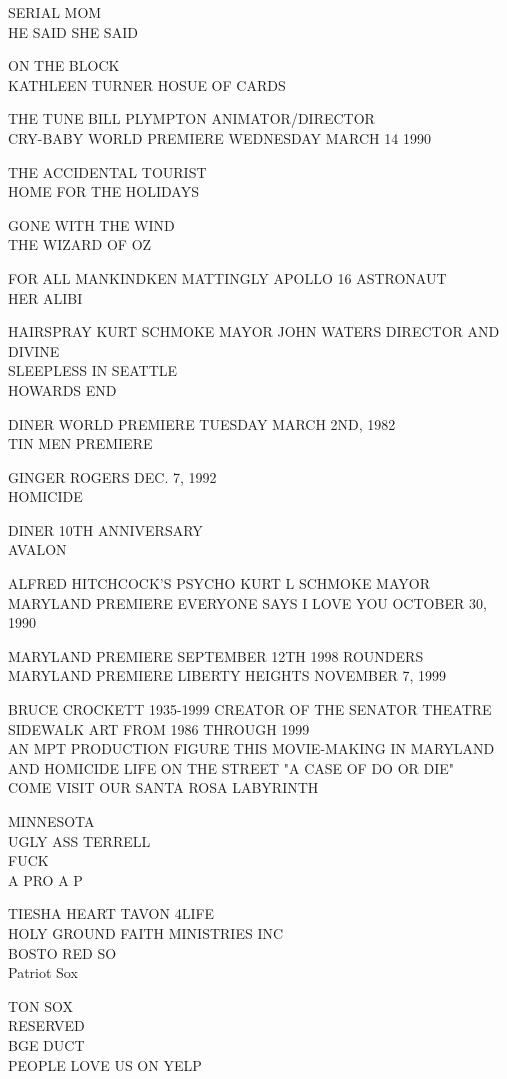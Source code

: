 \documentclass[10pt,letterpaper]{article}
\begin{document}
SERIAL MOM\\
HE SAID SHE SAID

ON THE BLOCK\\
KATHLEEN TURNER HOSUE OF CARDS

THE TUNE BILL PLYMPTON ANIMATOR/DIRECTOR\\
CRY{-}BABY WORLD PREMIERE WEDNESDAY MARCH 14 1990

THE ACCIDENTAL TOURIST\\
HOME FOR THE HOLIDAYS

GONE WITH THE WIND\\
THE WIZARD OF OZ

FOR ALL MANKINDKEN MATTINGLY APOLLO 16 ASTRONAUT\\
HER ALIBI

HAIRSPRAY KURT SCHMOKE MAYOR JOHN WATERS DIRECTOR AND DIVINE\\
SLEEPLESS IN SEATTLE\\
HOWARDS END

DINER WORLD PREMIERE TUESDAY MARCH 2ND, 1982\\
TIN MEN PREMIERE

GINGER ROGERS DEC. 7, 1992\\
HOMICIDE

DINER 10TH ANNIVERSARY\\
AVALON

ALFRED HITCHCOCK'S PSYCHO KURT L SCHMOKE MAYOR\\
MARYLAND PREMIERE EVERYONE SAYS I LOVE YOU OCTOBER 30, 1990

MARYLAND PREMIERE SEPTEMBER 12TH 1998 ROUNDERS\\
MARYLAND PREMIERE LIBERTY HEIGHTS NOVEMBER 7, 1999

BRUCE CROCKETT 1935{-}1999 CREATOR OF THE SENATOR THEATRE SIDEWALK ART FROM 1986 THROUGH 1999\\
AN MPT PRODUCTION FIGURE THIS MOVIE{-}MAKING IN MARYLAND AND HOMICIDE LIFE ON THE STREET "A CASE OF DO OR DIE"\\
COME VISIT OUR SANTA ROSA LABYRINTH

MINNESOTA\\
UGLY ASS TERRELL\\
FUCK\\
A PRO A P

TIESHA HEART TAVON 4LIFE\\
HOLY GROUND FAITH MINISTRIES INC\\
BOSTO RED SO\\
Patriot Sox

TON SOX\\
RESERVED\\
BGE DUCT\\
PEOPLE LOVE US ON YELP
\end{document}
